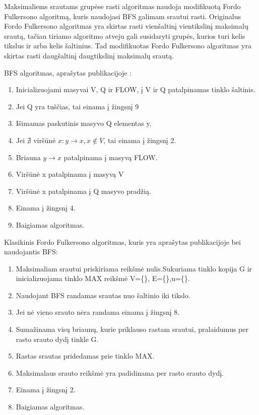 Maksimaliems srautams grupėse rasti algoritmas naudoja modifikuotą Fordo Fulkersono algoritmą, kuris naudojasi BFS galimam srautui rasti. Originalus Fordo Fulkersono algoritmas yra skirtas rasti vienšaltinį vientikslinį maksimalų srautą, tačiau tiriamo algoritmo atveju gali susidaryti grupės, kurios turi kelis tikslus ir arba kelis šaltinius. Tad modifikuotas Fordo Fulkersono algoritmas yra skirtas rasti daugšaltinį daugtikslinį maksimalų srautą.

BFS algoritmas, aprašytas publikacijoje \cite{BFS} :
\begin{enumerate}
	\item Inicializuojami masyvai V, Q ir FLOW, į V ir Q patalpinamas tinklo šaltinis.
	\item Jei Q yra tuščias, tai einama į žingsnį 9
	\item Išimamas paskutinis masyvo Q elementas y.
	\item Jei $\nexists$ viršūnė $x : y \rightarrow x, x \notin V$, tai einama į žingsnį 2. 
	\item Briauna $y  \rightarrow x$ patalpinama į masyvą FLOW. 
	\item Viršūnė x patalpinama į masyvą V
	\item Viršūnė x patalpinama į Q masyvo pradžią. 
	\item Einama į žingsnį 4. 
	\item Baigiamas algoritmas.
\end{enumerate}

Klasikinis Fordo Fulkersono algoritmas, kuris yra aprašytas publikacijoje \cite{FiN} bei naudojantis BFS:
\begin{enumerate}
	\item Maksimaliam srautui priskiriama reikšmė nulis.Sukuriama tinklo kopija G ir inicializuojama tinklo MAX reikšmė {V=\{\}, E=\{\},u=\{\}}.
	\item Naudojant BFS randamas srautas nuo šaltinio iki tikslo.
	\item Jei nė vieno srauto nėra randama einama į žingsnį 8.
	\item Sumažinama visų briaunų, kurie priklauso rastam srautui, pralaidumus per rasto srauto dydį tinkle G.
	\item Rastas srautas pridedamas prie tinklo MAX.
	\item Maksimalaus srauto reikšmė yra padidinama per rasto srauto dydį.
	\item Einama į žingsnį 2.
	\item Baigiamas algoritmas.
\end{enumerate}

